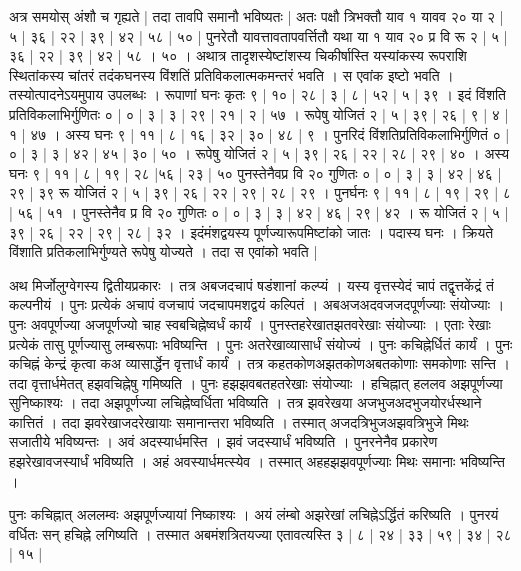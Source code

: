 \documentclass[11pt,a5paper]{book}
\begin{document}
{अत्र समयोस् अंशौ च गृह्यते | तदा तावपि
समानौ भविष्यतः | अतः पक्षौ त्रिभक्तौ याव १ यावव २० 
या २ | ५ | ३६ | २२ | ३९ | ४२ | ५८ | ५० | 
पुनरेतौ यावत्तावतापवर्त्तितौ यथा या १
याव २० प्र वि रू २ | ५ | ३६ | २२ | ३९ | ४२ | ५८ । ५० । 
अथात्र तादृशस्येष्टांशस्य चिकीर्षास्ति यस्यांकस्य रूपराशि
स्थितांकस्य चांतरं तदंकघनस्य विंशतिं 
प्रतिविकलात्मकमन्तरं भवति । स एवांक इष्टो भवति । तस्योत्पादनेऽयमुपाय उपलब्धः । रूपाणां घनः कृतः ९ | १० | २८ | ३ | ८ | ५२ | ५ | ३९ ।
इदं विंशति प्रतिविकलाभिर्गुणितः ० | ० | ३ | ३ | २९ | २१ | २ | ५७ । 
रूपेषु योजितं २ | ५ | ३९ | २६ | ९ | ४ | १ | ४७ । अस्य घनः ९ | ११ | ८ | १६ | ३२ | ३० | ४८ | ९ । 
पुनरिदं विंशतिप्रतिविकलाभिर्गुणितं ० | ० | ३ | ३ | ४२ | ४५ | ३० | ५० । 
रूपेषु योजितं २ | ५ | ३९ | २६ | २२ | २८ | २९ | ४० । अस्य घनः 
९ | ११ | ८ | १९ | २८ |५६ | २३ | ५० पुनस्तेनैवप्र वि
२० गुणितः ० | ० | ३ | ३ | ४२ | ४६ | २९ | ३९
रू योजितं २ | ५ | ३९ | २६ | २२ | २९ | २८ | २९ । पुनर्घनः ९ | ११ | ८ | १९ | २९ | ८ | ५६ | ५१ । 
पुनस्तेनैव प्र वि २० गुणितः ० | ० | ३ | ३ | ४२ | ४६ | २९ | ४२ ।
रू योजितं २ | ५ | ३९ | २६ | २२ | २९ | २८ | ३२ ।
इदंमंशद्वयस्य पूर्णज्यारूपमिष्टांको जातः । पदास्य घनः । क्रियते विंशाति प्रतिकलाभिर्गुण्यते
रूपेषु योज्यते । तदा स एवांको भवति | 




अथ मिर्जोलुग्वेगस्य द्वितीयप्रकारः । तत्र अबजदचापं षडंशानां कल्प्यं ।
यस्य वृत्तस्येदं चापं तद्वृत्तकेंद्रं तं कल्पनीयं । पुनः प्रत्येकं अचापं वजचापं जदचापमशद्वयं कल्पितं ।
अबअजअदवजजदपूर्णज्याः संयोज्याः । पुनः 
अवपूर्णज्या अजपूर्णज्यो चाह स्वबचिह्नेष्वर्धं कार्यं । पुनस्तहरेखातझतवरेखाः संयोज्याः । 
एताः रेखाः प्रत्येकं तासु पूर्णज्यासु लम्बरूपाः भविष्यन्ति । पुनः अतरेखाव्यासार्धं संयोज्यं । 
पुनः कचिह्नेर्धितं कार्यं । पुनः कचिह्नं केन्द्रं कृत्वा
कअ व्यासार्द्धेन वृत्तार्धं कार्यं । तत्र कहतकोणअझतकोणअबतकोणाः समकोणाः सन्ति । 
तदा वृत्तार्धमेतत् हझवचिह्नेषु गमिष्यति । पुनः हझझवबतहतरेखाः संयोज्याः । हचिह्नात् हललव अझपूर्णज्या सुनिष्काश्यः । 
तदा अझपूर्णज्या लचिह्नेष्वर्धिता भविष्यति । तत्र झवरेखया अजभुजअदभुजयोरर्धस्थाने कात्तितं । 
तदा झवरेखाजदरेखायाः समानान्तरा भविष्यति । तस्मात् अजदत्रिभुजअझवत्रिभुजे मिथः सजातीये भविष्यन्तः । अवं अदस्यार्धमस्ति ।  
झवं जदस्यार्धं भविष्यति । 
पुनरनेनैव प्रकारेण हझरेखावजस्यार्धं भविष्यति । अहं अवस्यार्धमत्स्येव । तस्मात् अहहझझवपूर्णज्याः मिथः समानाः भविष्यन्ति । 




पुनः कचिह्नात् अललम्वः अझपूर्णज्यायां निष्काश्यः । अयं लंम्बो अझरेखां लचिह्नेऽर्द्धितं करिष्यति । 
पुनरयं वर्धितः सन् हचिह्ने लगिष्यति । तस्मात अबमंशत्रितयज्या एतावत्यस्ति ३ | ८ | २४ | ३३ | ५९ | ३४ | २८ | १५ | 

}
\end{document}
